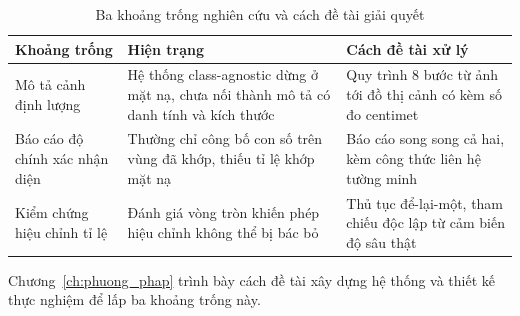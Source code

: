 \begin{table}[H]
\centering
\caption{Ba khoảng trống nghiên cứu và cách đề tài giải quyết}
\label{tab:khoang_trong}
\small
\begin{tabularx}{\textwidth}{p{3.4cm} X X}
\toprule
\textbf{Khoảng trống} & \textbf{Hiện trạng} & \textbf{Cách đề tài xử lý} \\
\midrule
Mô tả cảnh định lượng
  & Hệ thống class-agnostic dừng ở mặt nạ, chưa nối thành mô tả có danh tính và kích thước
  & Quy trình 8 bước từ ảnh tới đồ thị cảnh có kèm số đo centimet \\
\addlinespace
Báo cáo độ chính xác nhận diện
  & Thường chỉ công bố con số trên vùng đã khớp, thiếu tỉ lệ khớp mặt nạ
  & Báo cáo song song cả hai, kèm công thức liên hệ tường minh \\
\addlinespace
Kiểm chứng hiệu chỉnh tỉ lệ
  & Đánh giá vòng tròn khiến phép hiệu chỉnh không thể bị bác bỏ
  & Thủ tục để-lại-một, tham chiếu độc lập từ cảm biến độ sâu thật \\
\bottomrule
\end{tabularx}
\end{table}

Chương~\ref{ch:phuong_phap} trình bày cách đề tài xây dựng hệ thống và thiết kế thực nghiệm để
lấp ba khoảng trống này.
